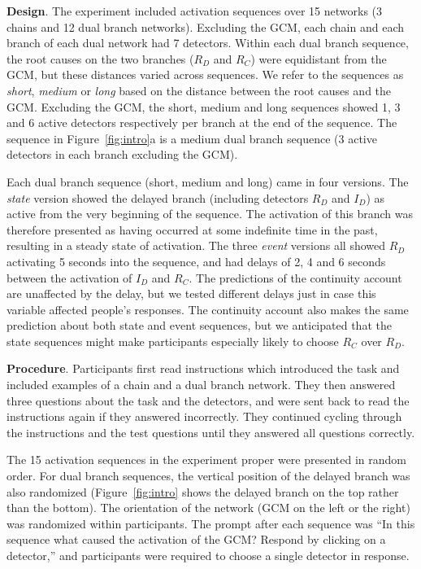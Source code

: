 \documentclass[10pt,letterpaper]{article}
\newcommand{\ev}[2]{$#1_#2$}
\begin{document}
\textbf{Design}.  The experiment included activation sequences over 15 networks (3 chains and 12 dual branch networks). Excluding the GCM, each chain and each branch of each dual network had 7 detectors.  Within each dual branch sequence, the root causes on the two branches (\ev{R}{D} and \ev{R}{C}) were equidistant from the GCM, but these distances varied across sequences.
We refer to the sequences as \emph{short}, \emph{medium} or \emph{long} based on the distance between the root causes and the GCM. Excluding the GCM, the short, medium and long sequences showed 1, 3 and 6 active detectors respectively per branch at the end of the sequence.  The sequence in Figure~\ref{fig:intro}a is a medium dual branch sequence (3 active detectors in each branch excluding the GCM).

Each dual branch sequence (short, medium and long) came in four versions. The \emph{state} version showed the delayed branch (including detectors \ev{R}{D} and \ev{I}{D}) as active from the very beginning of the sequence. The activation of this branch was therefore presented as having occurred at some indefinite time in the past, resulting in a steady state of activation. The three \emph{event} versions all showed \ev{R}{D} activating 5 seconds into the sequence, and had delays of 2, 4 and 6 seconds between the activation of \ev{I}{D} and \ev{R}{C}. The predictions of the continuity account are unaffected by the delay, but we tested different delays just in case this variable affected people's responses. The continuity account also makes the same prediction about both state and event sequences, but we anticipated that the state sequences might make participants especially likely to choose \ev{R}{C} over \ev{R}{D}.

\textbf{Procedure}. 
Participants first read instructions which introduced the task and included examples of a chain and a dual branch network. They then answered three questions about the task and the detectors, and were sent back to read the instructions again if they answered incorrectly. They continued cycling through the instructions and the test questions until they answered all questions correctly.

The 15 activation sequences in the experiment proper were presented in random order. For dual branch sequences, the vertical position of the delayed branch was also randomized (Figure~\ref{fig:intro} shows the delayed branch on the top rather than the bottom). The orientation of the network (GCM on the left or the right) was randomized within participants.  The prompt after each sequence was ``In this sequence what caused the activation of the GCM? Respond by clicking on a detector,'' and participants were required to choose a single detector in response. 
\end{document}
